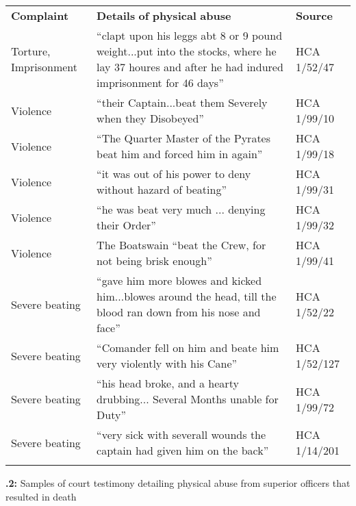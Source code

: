 \tabletail{}
\tablelasttail{}
\begin{tabularx}{\textwidth}{XXX}

\lsptoprule

\textbf{Complaint} & \textbf{Details} \textbf{of} \textbf{physical} \textbf{abuse} & \textbf{Source}\\
Torture, Imprisonment & “clapt upon his leggs abt 8 or 9 pound weight...put into the stocks, where he lay 37 houres and after he had indured imprisonment for 46 days” & HCA 1/52/47\\
Violence & “their Captain...beat them Severely when they Disobeyed” & HCA 1/99/10\\
Violence & “The Quarter Master of the Pyrates beat him and forced him in again” & HCA 1/99/18\\
Violence & “it was out of his power to deny without hazard of beating” & HCA 1/99/31\\
Violence & “he was beat very much ... denying their Order” & HCA 1/99/32\\
Violence & The Boatswain “beat the Crew, for not being brisk enough” & HCA 1/99/41\\
Severe beating & “gave him more blowes and kicked him...blowes around the head, till the blood ran down from his nose and face” & HCA 1/52/22\\
Severe beating & “Comander fell on him and beate him very violently with his Cane” & HCA 1/52/127\\
Severe beating & “his head broke, and a hearty drubbing... Several Months unable for Duty” & HCA 1/99/72\\
Severe beating & “very sick with severall wounds the captain had given him on the back” & HCA 1/14/201\\
\lspbottomrule
\end{tabularx}
\textbf{.2:} Samples of court testimony detailing physical abuse from superior officers that resulted in death

\tablefirsthead{}

